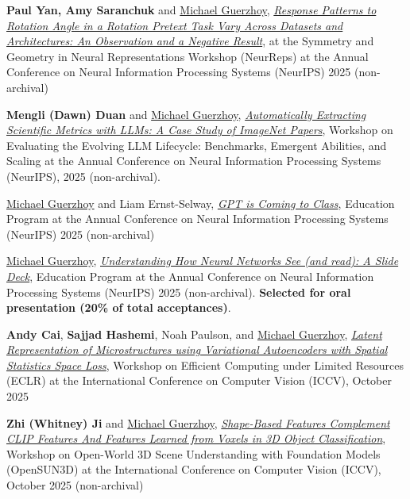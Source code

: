 \documentclass[letterpaper,11pt]{article}
\begin{document}
\begin{revnumerate}
\item \textbf{Paul Yan, Amy Saranchuk} and \underline{Michael Guerzhoy}, \href{https://openreview.net/pdf?id=85rdlgTS50}{\textit{Response Patterns to Rotation Angle in a Rotation Pretext Task Vary Across Datasets and Architectures: An Observation and a Negative Result}}, at the Symmetry and Geometry in Neural Representations Workshop (NeurReps) at the Annual Conference on Neural Information Processing Systems (NeurIPS) 2025 (non-archival)

\item \textbf{Mengli (Dawn) Duan} and \underline{Michael Guerzhoy}, \href{https://openreview.net/pdf?id=p0DeYk22Xu}{\textit{Automatically Extracting Scientific Metrics with LLMs: A Case Study of ImageNet Papers}}, Workshop on Evaluating the Evolving LLM Lifecycle: Benchmarks, Emergent Abilities, and Scaling at the Annual Conference on Neural Information Processing Systems (NeurIPS), 2025 (non-archival).

\item \underline{Michael Guerzhoy} and Liam Ernst-Selway, \href{https://openreview.net/forum?id=NFtoVPrxXs}{\textit{GPT is Coming to Class}}, Education Program at the  Annual Conference on Neural Information Processing Systems (NeurIPS) 2025 (non-archival)

\item \underline{Michael Guerzhoy}, \href{https://openreview.net/forum?id=vHlXiUBvGV}{\textit{Understanding How Neural Networks See  (and read): A Slide Deck}},  Education Program at the Annual Conference on Neural Information Processing Systems (NeurIPS) 2025 (non-archival). \textbf{Selected for oral presentation (20\% of total acceptances)}.


\item \textbf{Andy Cai}, \textbf{Sajjad Hashemi}, Noah Paulson, and \underline{Michael Guerzhoy}, \href{https://openaccess.thecvf.com/content/ICCV2025W/ECLR/papers/Cai_Latent_Representation_of_Microstructures_using_Variational_Autoencoders_with_Spatial_Statistics_ICCVW_2025_paper.pdf}{\textit{Latent Representation of Microstructures using Variational Autoencoders with Spatial Statistics Space Loss}}, Workshop on Efficient Computing under Limited Resources (ECLR) at the International Conference on Computer Vision (ICCV), October 2025 

\item \textbf{Zhi (Whitney) Ji} and \underline{Michael Guerzhoy}, \href{https://openreview.net/pdf?id=SsN20QK21G}{\textit{Shape-Based Features Complement CLIP Features And Features Learned from Voxels in 3D Object Classification}}, Workshop on Open-World 3D Scene Understanding with Foundation Models (OpenSUN3D) at the International Conference on Computer Vision (ICCV), October 2025 (non-archival)


\end{revnumerate}
\end{document}
